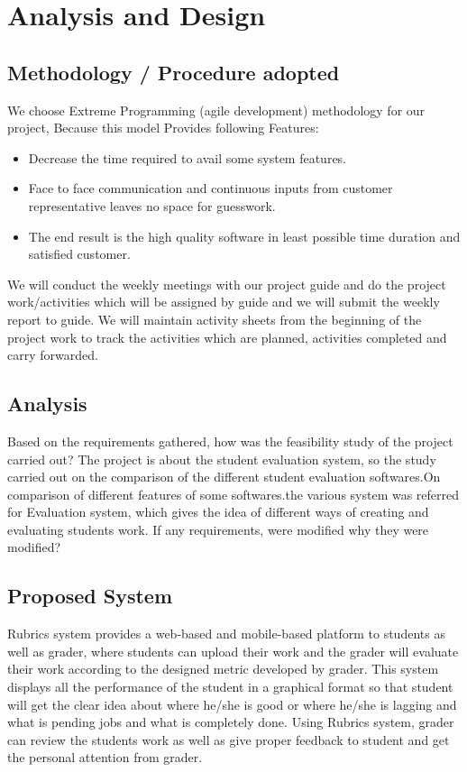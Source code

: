 \chapter{Analysis and Design}
\section{Methodology / Procedure adopted}
We choose Extreme Programming (agile development) methodology for our project, Because this model Provides following Features:
\begin{itemize}
    \item Decrease the time required to avail some system features.
    \item Face to face communication and continuous inputs from customer representative leaves no space for guesswork.
    \item The end result is the high quality software in least possible time duration and satisfied customer.
\end{itemize}
We will conduct the weekly meetings with our project guide and do the project work/activities which will be assigned by guide and we will submit the weekly report to guide. We will maintain activity sheets from the beginning of the project work to track the activities which are planned, activities completed and carry forwarded.

\section{Analysis}
Based on the requirements gathered, how was the feasibility study of the project carried out?
The project is about the student evaluation system, so the study carried out on the comparison of the different student evaluation softwares.On comparison of different features of some softwares.the various system was referred for Evaluation system, which gives the idea of different ways of creating and evaluating students work.
If any requirements, were modified why they were modified?

\section{Proposed System}
Rubrics system provides a web-based and mobile-based platform to students as well as grader, where students can upload their work and the grader will evaluate their work according to the designed metric developed by grader.
This system displays all the performance of the student in a graphical format so that student will get the clear idea about where he/she is good or where he/she is lagging and what is pending jobs and what is completely done.
Using Rubrics system, grader can review the students work as well as give proper feedback to student and get the personal attention from grader.

